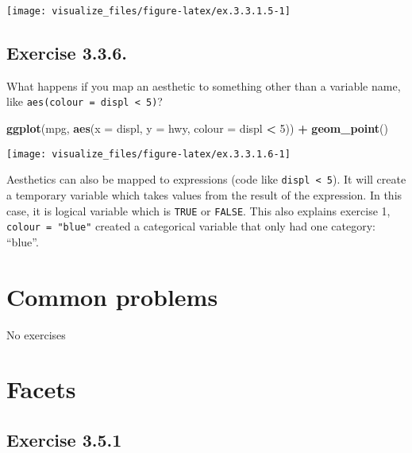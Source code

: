 \documentclass[]{book}
\newenvironment{Shaded}{\begin{snugshade}}{\end{snugshade}}
\newcommand{\DataTypeTok}[1]{\textcolor[rgb]{0.13,0.29,0.53}{#1}}
\newcommand{\DecValTok}[1]{\textcolor[rgb]{0.00,0.00,0.81}{#1}}
\newcommand{\KeywordTok}[1]{\textcolor[rgb]{0.13,0.29,0.53}{\textbf{#1}}}
\newcommand{\NormalTok}[1]{#1}
\newcommand{\OperatorTok}[1]{\textcolor[rgb]{0.81,0.36,0.00}{\textbf{#1}}}
\newcommand{\StringTok}[1]{\textcolor[rgb]{0.31,0.60,0.02}{#1}}
\theoremstyle{plain}
\theoremstyle{remark}
\theoremstyle{definition}
\theoremstyle{definition}
\theoremstyle{definition}
\theoremstyle{remark}
\begin{document}
\begin{center}\texttt{[image: visualize\_files/figure-latex/ex.3.3.1.5-1]} \end{center}

\hypertarget{exercise-3.3.6.}{%
\subsection*{\texorpdfstring{Exercise
{3.3.6}.}{Exercise 3.3.6.}}\label{exercise-3.3.6.}}

What happens if you map an aesthetic to something other than a variable
name, like \texttt{aes(colour\ =\ displ\ \textless{}\ 5)}?

\begin{Shaded}
\begin{Highlighting}[]
\KeywordTok{ggplot}\NormalTok{(mpg, }\KeywordTok{aes}\NormalTok{(}\DataTypeTok{x =}\NormalTok{ displ, }\DataTypeTok{y =}\NormalTok{ hwy, }\DataTypeTok{colour =}\NormalTok{ displ }\OperatorTok{<}\StringTok{ }\DecValTok{5}\NormalTok{)) }\OperatorTok{+}
\StringTok{  }\KeywordTok{geom_point}\NormalTok{()}
\end{Highlighting}
\end{Shaded}

\begin{center}\texttt{[image: visualize\_files/figure-latex/ex.3.3.1.6-1]} \end{center}

Aesthetics can also be mapped to expressions (code like
\texttt{displ\ \textless{}\ 5}). It will create a temporary variable
which takes values from the result of the expression. In this case, it
is logical variable which is \texttt{TRUE} or \texttt{FALSE}. This also
explains exercise 1, \texttt{colour\ =\ "blue"} created a categorical
variable that only had one category: ``blue''.

\hypertarget{common-problems}{%
\section{Common problems}\label{common-problems}}

No exercises

\hypertarget{facets}{%
\section{Facets}\label{facets}}

\hypertarget{exercise-3.5.1}{%
\subsection*{\texorpdfstring{Exercise
{3.5.1}}{Exercise 3.5.1}}\label{exercise-3.5.1}}
\end{document}
